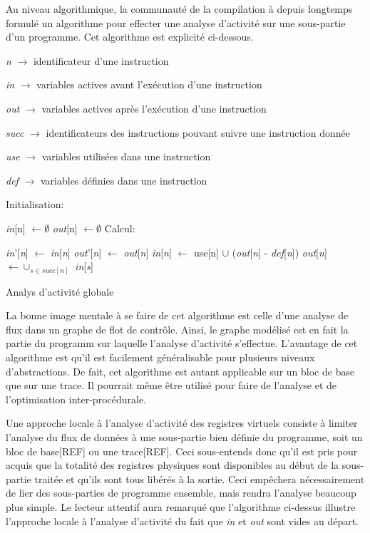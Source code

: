 \documentclass{article} %
\begin{document}
Au niveau algorithmique, la communauté de la compilation à depuis longtemps formulé un algorithme pour effecter une analyse d'activité sur une sous-partie d'un programme. Cet algorithme est explicité ci-dessous.

\begin{algorithm}[H]
 \KwData
 {
 	
 	\textit{n} $\rightarrow$ identificateur d'une instruction
 
	\textit{in} $\rightarrow$ variables actives avant l'exécution d'une instruction

 	\textit{out} $\rightarrow$ variables actives après l'exécution d'une instruction
 	
 	\textit{succ} $\rightarrow$ identificateurs des instructions pouvant suivre une instruction donnée
 	
 	\textit{use} $\rightarrow$ variables utilisées dans une instruction
 	
 	\textit{def} $\rightarrow$ variables définies dans une instruction
 }
 Initialisation:
 
 {
 	\textit{in}[n] $\leftarrow \emptyset$\;
 	\textit{out}[n] $\leftarrow \emptyset$\;
 }
 Calcul:
 
 {
  	{
  		\textit{in}'[\textit{n}] $\leftarrow$ \textit{in}[\textit{n}]\;
  		\textit{out}'[\textit{n}] $\leftarrow$ \textit{out}[\textit{n}]\;
  		\textit{in}[\textit{n}] $\leftarrow$ use[n] $\cup$ (\textit{out}[\textit{n}] - \textit{def}[\textit{n}])\;
  		\textit{out}[\textit{n}] $\leftarrow \cup_{s \in succ[n]}$ \textit{in}[\textit{s}]\;
  	}
 }
 \caption{Analys d'activité globale}
\end{algorithm}

La bonne image mentale à se faire de cet algorithme est celle d'une analyse de flux dans un graphe de flot de contrôle. Ainsi, le graphe modélisé est en fait la partie du programm sur laquelle l'analyse d'activité s'effectue. L'avantage de cet algorithme est qu'il est facilement généralisable pour plusieurs niveaux d'abstractions. De fait, cet algorithme est autant applicable sur un bloc de base que sur une trace. Il pourrait même être utilisé pour faire de l'analyse et de l'optimisation inter-procédurale.

Une approche locale à l'analyse d'activité des registres virtuels consiste à limiter l'analyse du flux de données à une sous-partie bien définie du programme, soit un bloc de base[REF] ou une trace[REF]. Ceci sous-entends donc qu'il est pris pour acquis que la totalité des registres physiques sont disponibles au début de la sous-partie traitée et qu'ils sont tous libérés à la sortie. Ceci empêchera nécessairement de lier des sous-parties de programme ensemble, mais rendra l'analyse beaucoup plus simple. Le lecteur attentif aura remarqué que l'algorithme ci-dessus illustre l'approche locale à l'analyse d'activité du fait que \textit{in} et \textit{out} sont vides au départ.
\end{document}
